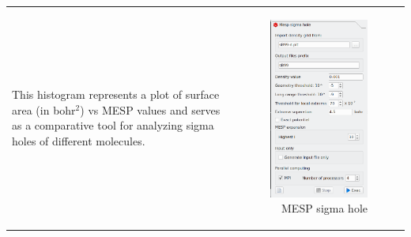 \documentclass[10pt]{article}
\begin{document}
\begin{tabular}{lr}
\begin{minipage}{.6\linewidth}
This histogram represents a plot of surface area (in bohr$^2$) vs MESP values
and serves as a comparative tool for analyzing sigma holes
of different molecules.

\end{minipage}
&
\begin{minipage}{.4\linewidth}
\begin{figure}[H]
\begin{center}
\vspace*{-0.5mm}
\includegraphics[width=.8\linewidth]{damqt320_mesp_sg_hole.png}
\end{center}
\caption{{MESP sigma hole}\label{fig:2_7}}
\end{figure}
\end{minipage}
\end{tabular}

\vspace*{0.4mm}
\end{document}

